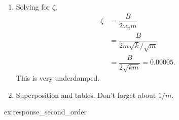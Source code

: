 \documentclass[dynamic_systems.tex]{subfiles}
\begin{document}
{\begin{enumerate}
	  Equate the coefficients:
	  \begin{align*}
	  	\dfrac{B}{m} = 2\zeta\omega_n 
	  	\quad \text{and} \quad
	  	\dfrac{k}{m} = \omega_n^2.
	  \end{align*}
	  Solving for $\omega_n$,
	  \begin{align*}
	  	\omega_n = \sqrt{\dfrac{k}{m}} = 62.8\text{ krad/s}.
	  \end{align*}
	  \item 
	  Solving for $\zeta$,
	  \begin{align*}
	  	\zeta &= \dfrac{B}{2\omega_n m} \\
	  	&= \dfrac{B}{2 m \sqrt{k}/\sqrt{m}} \\
	  	&= \dfrac{B}{2\sqrt{k m}} = 0.00005.
	  \end{align*}
	  This is very underdamped.
	  \item 
	  Superposition and tables. Don't forget about $1/m$.
	  \vspace{10\baselineskip}
  \end{enumerate}
}{%
ex:response_second_order%
}
\end{document}
